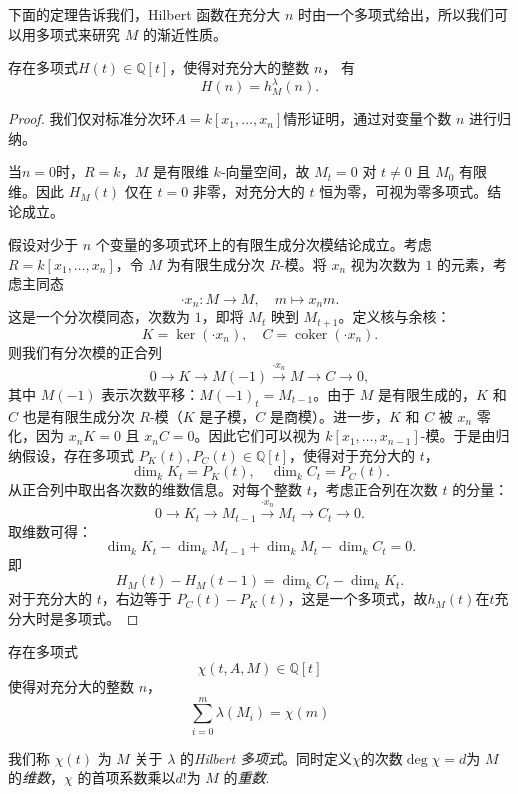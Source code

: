 下面的定理告诉我们，Hilbert 函数在充分大 $n$ 时由一个多项式给出，所以我们可以用多项式来研究 $M$ 的渐近性质。
\begin{theorem}
    存在多项式$H(t)\in\mathbb{Q}[t]$，使得对充分大的整数 $n$，
    有
    \begin{equation*}
        H(n)=h_M^\lambda(n).
    \end{equation*}
\end{theorem}

\begin{proof}
    我们仅对标准分次环$A=k[x_1, \dots, x_n]$情形证明，通过对变量个数 \( n \) 进行归纳。

    当$n = 0 $时，\( R = k \)，\( M \) 是有限维 \( k \)-向量空间，故 \( M_t = 0 \) 对 \( t \neq 0 \) 且 \( M_0 \) 有限维。因此 \( H_M(t) \) 仅在 \( t = 0 \) 非零，对充分大的 \( t \) 恒为零，可视为零多项式。结论成立。

    假设对少于 \( n \) 个变量的多项式环上的有限生成分次模结论成立。考虑 \( R = k[x_1, \dots, x_n] \)，令 \( M \) 为有限生成分次 \( R \)-模。将 \( x_n \) 视为次数为 \( 1 \) 的元素，考虑主同态
    \[
        \cdot x_n : M \to M, \quad m \mapsto x_n m.
    \]
    这是一个分次模同态，次数为 \( 1 \)，即将 \( M_t \) 映到 \( M_{t+1} \)。定义核与余核：
    \[
        K = \ker(\cdot x_n), \quad C = \operatorname{coker}(\cdot x_n).
    \]
    则我们有分次模的正合列
    \[
        0 \to K \to M(-1) \xrightarrow{\cdot x_n} M \to C \to 0,
    \]
    其中 \( M(-1) \) 表示次数平移：\( M(-1)_t = M_{t-1} \)。由于 \( M \) 是有限生成的，\( K \) 和 \( C \) 也是有限生成分次 \( R \)-模（\( K \) 是子模，\( C \) 是商模）。进一步，\( K \) 和 \( C \) 被 \( x_n \) 零化，因为 \( x_n K = 0 \) 且 \( x_n C = 0 \)。因此它们可以视为 \( k[x_1, \dots, x_{n-1}] \)-模。于是由归纳假设，存在多项式 \( P_K(t), P_C(t) \in \mathbb{Q}[t] \)，使得对于充分大的 \( t \)，
    \[
        \dim_k K_t = P_K(t), \quad \dim_k C_t = P_C(t).
    \]
    从正合列中取出各次数的维数信息。对每个整数 \( t \)，考虑正合列在次数 \( t \) 的分量：
    \[
        0 \to K_t \to M_{t-1} \xrightarrow{\cdot x_n} M_t \to C_t \to 0.
    \]
    取维数可得：
    \[
        \dim_k K_t - \dim_k M_{t-1} + \dim_k M_t - \dim_k C_t = 0.
    \]
    即
    \[
        H_M(t) - H_M(t-1) = \dim_k C_t - \dim_k K_t.
    \]
    对于充分大的 \( t \)，右边等于 \( P_C(t) - P_K(t) \)，这是一个多项式，故$h_M(t)$在$t$充分大时是多项式。
\end{proof}



\begin{corollary}
    存在多项式
    \[
        \chi(t,A,M)\in\mathbb{Q}[t]
    \]
    使得对充分大的整数 $n$，
    \[
        \sum_{i=0}^{m}
        \lambda(M_i)
        =
        \chi(m)
    \]
\end{corollary}
我们称 $\chi(t)$ 为 $M$ 关于 $\lambda$ 的\emph{Hilbert 多项式}。同时定义$\chi$的次数$\deg \chi=d$为 $M$ 的\emph{维数}，$\chi$ 的首项系数乘以$d!$为 $M$ 的\emph{重数}.


